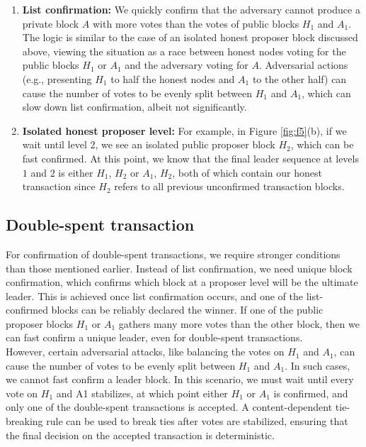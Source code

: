 \documentclass{report}
\begin{document}
\begin{enumerate}
	\item \textbf{List confirmation:} We quickly confirm that the adversary cannot produce a private block $A$ with more votes than the votes of public blocks $H_{1}$ and $A_{1}$. The logic is similar to the case of an isolated honest proposer block discussed above, viewing the situation as a race between honest nodes voting for the public blocks $H_{1}$ or $A_{1}$ and the adversary voting for $A$. Adversarial actions (e.g., presenting $H_{1}$ to half the honest nodes and $A_{1}$ to the other half) can cause the number of votes to be evenly split between $H_{1}$ and $A_{1}$, which can slow down list confirmation, albeit not significantly.
	\item \textbf{Isolated honest proposer level:} For example, in Figure \ref{fig:f5}(b), if we wait until level $2$, we see an isolated public proposer block $H_{2}$, which can be fast confirmed. At this point, we know that the final leader sequence at levels $1$ and $2$ is either $H_{1}$, $H_{2}$ or $A_{1}$, $H_{2}$, both of which contain our honest transaction since $H_{2}$ refers to all previous unconfirmed transaction blocks.
\end{enumerate}
\subsection{Double-spent transaction}
For confirmation of double-spent transactions, we require stronger conditions than those mentioned earlier. Instead of list confirmation, we need unique block confirmation, which confirms which block at a proposer level will be the ultimate leader. This is achieved once list confirmation occurs, and one of the list-confirmed blocks can be reliably declared the winner. If one of the public proposer blocks $H_{1}$ or $A_{1}$ gathers many more votes than the other block, then we can fast confirm a unique leader, even for double-spent transactions.\\
However, certain adversarial attacks, like balancing the votes on $H_{1}$ and $A_{1}$, can cause the number of votes to be evenly split between $H_{1}$ and $A_{1}$. In such cases, we cannot fast confirm a leader block. In this scenario, we must wait until every vote on $H_{1}$ and A1 stabilizes, at which point either $H_{1}$ or $A_{1}$ is confirmed, and only one of the double-spent transactions is accepted. A content-dependent tie-breaking rule can be used to break ties after votes are stabilized, ensuring that the final decision on the accepted transaction is deterministic.
\end{document}
